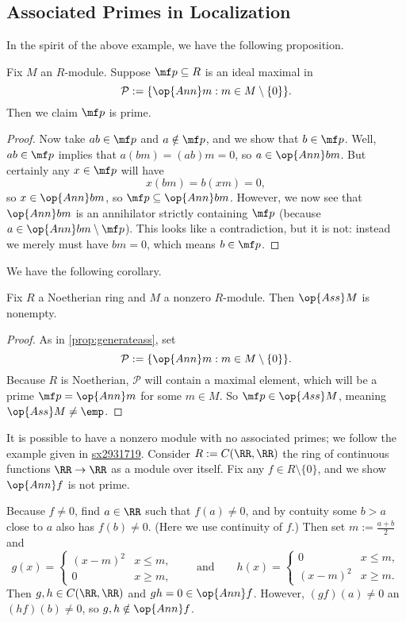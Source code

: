 \subsection{Associated Primes in Localization}
In the spirit of the above example, we have the following proposition.
\begin{proposition} \label{prop:generateass}
	Fix $M$ an $R$-module. Suppose $\mf p\subseteq R$ is an ideal maximal in
	\[\mathcal P:=\{\op{Ann}m:m\in M\setminus\{0\}\}.\]
	Then we claim $\mf p$ is prime.
\end{proposition}
\begin{proof}
	Now take $ab\in\mf p$ and $a\notin\mf p$, and we show that $b\in\mf p$. Well, $ab\in\mf p$ implies that $a(bm)=(ab)m=0$, so $a\in\op{Ann}bm$. But certainly any $x\in\mf p$ will have
	\[x(bm)=b(xm)=0,\]
	so $x\in\op{Ann}bm$, so $\mf p\subseteq\op{Ann}bm$. However, we now see that $\op{Ann}bm$ is an annihilator strictly containing $\mf p$ (because $a\in\op{Ann}bm\setminus\mf p$). This looks like a contradiction, but it is not: instead we merely must have $bm=0$, which means $b\in\mf p$.
\end{proof}
We have the following corollary.
\begin{corollary} \label{cor:hasass}
	Fix $R$ a Noetherian ring and $M$ a nonzero $R$-module. Then $\op{Ass}M$ is nonempty.
\end{corollary}
\begin{proof}
	As in \autoref{prop:generateass}, set
	\[\mathcal P:=\{\op{Ann}m:m\in M\setminus\{0\}\}.\]
	Because $R$ is Noetherian, $\mathcal P$ will contain a maximal element, which will be a prime $\mf p=\op{Ann}m$ for some $m\in M$. So $\mf p\in\op{Ass}M$, meaning $\op{Ass}M\ne\emp$.
\end{proof}
\begin{remark}[Nir]
	It is possible to have a nonzero module with no associated primes; we follow the example given in \href{https://math.stackexchange.com/a/3365952/869257}{sx2931719}. Consider $R:=C(\RR,\RR)$ the ring of continuous functions $\RR\to\RR$ as a module over itself. Fix any $f\in R\setminus\{0\}$, and we show $\op{Ann}f$ is not prime.

	Because $f\ne0$, find $a\in\RR$ such that $f(a)\ne0$, and by contuity some $b>a$ close to $a$ also has $f(b)\ne0$. (Here we use continuity of $f$.) Then set $m:=\frac{a+b}2$ and
	\[g(x)=\begin{cases}
		(x-m)^2 & x \le m, \\
		0 & x \ge m,
	\end{cases}\qquad\text{and}\qquad h(x)=\begin{cases}
		0 & x \le m, \\
		(x-m)^2 & x \ge m.
	\end{cases}\]
	Then $g,h\in C(\RR,\RR)$ and $gh=0\in\op{Ann}f$. However, $(gf)(a)\ne0$ an $(hf)(b)\ne0$, so $g,h\notin\op{Ann}f$.
\end{remark}

